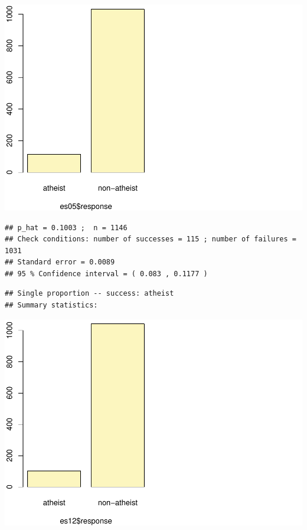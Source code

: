 \documentclass[]{article}
\newenvironment{Shaded}{\begin{snugshade}}{\end{snugshade}}
\newcommand{\KeywordTok}[1]{\textcolor[rgb]{0.13,0.29,0.53}{\textbf{#1}}}
\newcommand{\DataTypeTok}[1]{\textcolor[rgb]{0.13,0.29,0.53}{#1}}
\newcommand{\StringTok}[1]{\textcolor[rgb]{0.31,0.60,0.02}{#1}}
\newcommand{\OperatorTok}[1]{\textcolor[rgb]{0.81,0.36,0.00}{\textbf{#1}}}
\newcommand{\NormalTok}[1]{#1}
\begin{document}
\includegraphics{DATA_606_Lab_6_files/figure-latex/unnamed-chunk-6-1.pdf}

\begin{verbatim}
## p_hat = 0.1003 ;  n = 1146 
## Check conditions: number of successes = 115 ; number of failures = 1031 
## Standard error = 0.0089 
## 95 % Confidence interval = ( 0.083 , 0.1177 )
\end{verbatim}

\begin{Shaded}
\end{Shaded}

\begin{verbatim}
## Single proportion -- success: atheist 
## Summary statistics:
\end{verbatim}

\includegraphics{DATA_606_Lab_6_files/figure-latex/unnamed-chunk-6-2.pdf}
\end{document}
